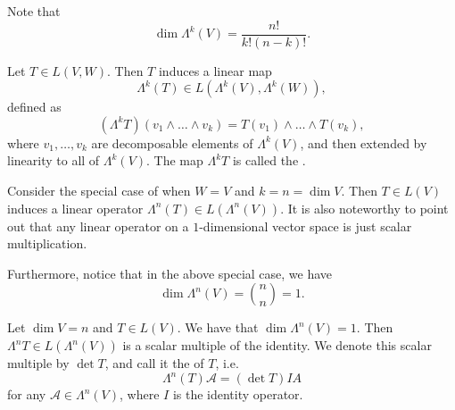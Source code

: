 \documentclass[notoc,notitlepage]{tufte-book}
\begin{document}
\begin{note}
  Note that
  \begin{equation*}
    \dim \Lambda^k(V) = \frac{n!}{k! (n - k)!}.
  \end{equation*}
\end{note}

\begin{defn}\label{defn:_k_th_exterior_power_of_t_}
  Let $T \in L(V, W)$. Then $T$ induces a linear map
  \begin{equation*}
    \Lambda^k(T) \in L \left( \Lambda^k(V), \Lambda^k(W) \right),
  \end{equation*}
  defined as
  \begin{equation*}
    \left( \Lambda^k T \right)(v_1 \land \hdots \land v_k) = T(v_1) \land \hdots \land T(v_k),
  \end{equation*}
  where $v_1, \ldots, v_k$ are decomposable elements of $\Lambda^k(V)$, and then extended
  by linearity to all of $\Lambda^k(V)$. The map $\Lambda^k T$ is called the
  .
\end{defn}

\begin{note}
  Consider the special case of when $W = V$ and $k = n = \dim V$. Then $T \in L(V)$
  induces a linear operator $\Lambda^n(T) \in L(\Lambda^n(V))$. It is also noteworthy
  to point out that any linear operator on a $1$-dimensional vector space is just
  scalar multiplication.

  Furthermore, notice that in the above special case, we have
  \begin{equation*}
    \dim \Lambda^n(V) = \binom{n}{n} = 1.
  \end{equation*}
\end{note}

\begin{defn}[Determinant]\label{defn:determinant}
  Let $\dim V = n$ and $T \in L(V)$. We have that $\dim \Lambda^n(V) = 1$. Then
  $\Lambda^n T \in L \left( \Lambda^n(V) \right)$ is a scalar multiple of the
  identity. We denote this scalar multiple by $\det T$, and call it the
   of $T$, i.e.
  \begin{equation*}
    \Lambda^n (T) \mathcal{A} = (\det T) IA
  \end{equation*}
  for any $\mathcal{A} \in \Lambda^n(V)$, where $I$ is the identity operator.
\end{defn}
\end{document}
